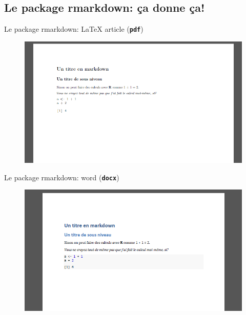\documentclass[10pt, xcolors={RGB}, hyperref={pdfpagelabels=false,
        colorlinks=true,
        linkcolor=black,
        urlcolor=black,
        citecolor=black,
        filecolor=black,
        menucolor=black,
        pdftex=true,
        bookmarks=true,
        bookmarksopen=true,
        hyperfootnotes=true}]{beamer}
\newcommand\cmdb[1]{\texttt{\color{dodgerblue}\textbf{#1}}}
\begin{document}
\subsection{Le package rmarkdown: ça donne ça!}
\begin{frame}{Le package rmarkdown: \LaTeX{} article (\cmdb{pdf})}
\begin{center}
    \begin{figure}
        \includegraphics[width=0.75\paperwidth, keepaspectratio]{figures/article.png}
    \end{figure}
\end{center}
\end{frame}

\begin{frame}{Le package rmarkdown: word (\cmdb{docx})}
\begin{center}
    \begin{figure}
        \includegraphics[width=0.75\paperwidth, keepaspectratio]{figures/word.png}
    \end{figure}
\end{center}
\end{frame}
\end{document}
